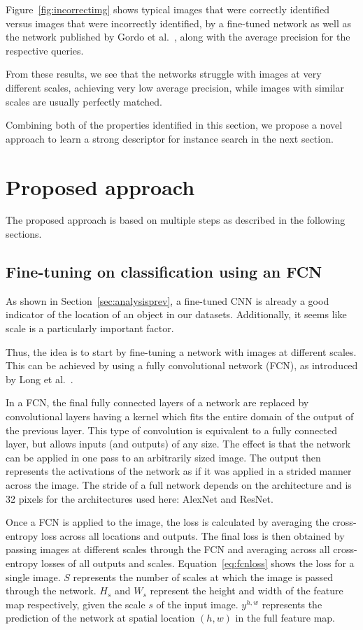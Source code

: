 Figure~\ref{fig:incorrectimg}
shows typical images that were correctly identified versus images that
were incorrectly identified, by a fine-tuned network as well as the network
published by Gordo et al.~\cite{gordo_deep_2016}, along with the average
precision for the respective queries.

From these results, we see that the networks struggle with images at
very different scales, achieving very low average precision,
while images with similar scales are usually perfectly matched.

Combining both of the properties identified in this section, we
propose a novel approach to learn a strong descriptor for instance
search in the next section.

\section{Proposed approach}\label{sec:proposed}
The proposed approach is based on multiple steps as described in the
following sections.

\subsection{Fine-tuning on classification using an FCN}\label{sec:fcnfinetune}
As shown in Section~\ref{sec:analysisprev}, a fine-tuned CNN is already
a good indicator of the location of an object in our datasets.
Additionally, it seems like scale is a particularly important factor.

Thus, the idea is to start by fine-tuning a network with images
at different scales. This can be achieved by using a fully
convolutional network (FCN), as introduced by
Long et al.~\cite{long_fully_2015}.

In a FCN, the final fully connected layers
of a network are replaced by convolutional layers having a kernel
which fits the entire domain of the output of the previous layer.
This type of convolution is equivalent to a fully connected layer,
but allows inputs (and outputs) of any size.
The effect is that the network can be applied in one pass to an
arbitrarily sized image. The output then represents the activations
of the network as if it was applied in a strided manner across the image.
The stride of a full network depends on the architecture and is 32
pixels for the architectures used here: AlexNet and ResNet.

Once a FCN is applied to the image, the loss
is calculated by averaging the cross-entropy loss across all locations
and outputs.
The final loss is then obtained by passing images at different scales
through the FCN and averaging across all cross-entropy losses of all
outputs and scales. Equation~\ref{eq:fcnloss} shows the loss for a
single image. $S$ represents the number of scales at which the image
is passed through the network.
$H_s$ and $W_s$ represent the height and width of the feature
map respectively, given the scale $s$ of the input image. $y^{h,w}$
represents the prediction of the network at spatial location
$(h,w)$ in the full feature map.

